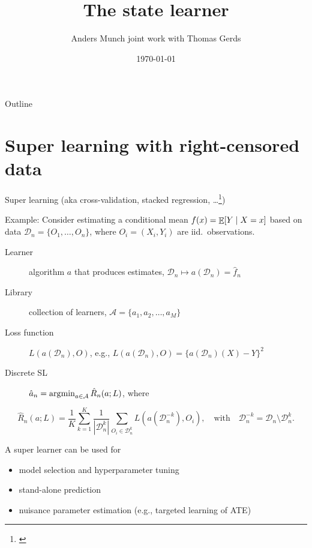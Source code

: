 \documentclass[smaller]{beamer}\usepackage{listings}
\author{Anders Munch \newline \small joint work with Thomas Gerds}
\date{\today}
\title{The state learner}
\begin{document}
\maketitle
\begin{frame}{Outline}
\tableofcontents
\end{frame}

\section{Super learning with right-censored data}
\label{sec:org2992df4}
\begin{frame}[label={sec:orgf51b327}]{Super learning \small (aka cross-validation, stacked regression, \ldots{}\footnote{\cite{stone1974cross,geisser1975predictive,wolpert1992stacked,breiman1996stacked,van2007super}})}
\small

\color{bblue}Example: \color{black} Consider estimating a conditional mean \(f(x) = {\mathop{{\mathbb{E}}}}[Y \mid X=x]\) based on data \(\mathcal{D}_n = \{O_1, \dots, O_n\}\), where \(O_i = (X_i, Y_i)\) are iid.~observations.

\vfill

\begin{description}
\item[{Learner}] algorithm \(a\) that produces estimates, \(\mathcal{D}_n \mapsto
  a(\mathcal{D}_n) = \hat f_n\)
\item[{Library}] collection of learners, \(\mathcal{A} = \{a_1, a_2, \dots, a_M \}\)
\item[{Loss function}] \(L(a(\mathcal{D}_n), O)\), e.g., \(L(a(\mathcal{D}_n), O)
  = \{a(\mathcal{D}_n)(X) - Y\}^2\) \pause
\item[{Discrete SL}] \(\hat{a}_n = \operatorname*{\arg\!\min}_{a\in\mathcal A}\hat{R}_n(a;
  L)\), where
\end{description}
\begin{equation*}
  \hat{R}_n(a; L) =
  \frac{1}{K}\sum_{k=1}^{K}
  \frac{1}{| \mathcal{D}_n^{k} |}\sum_{O_i \in \mathcal{D}_n^{k}}
  L
  {
    \left(
      a{ (\mathcal{D}_n^{-k})}
      , O_i
    \right)
  },
  \quad \text{with} \quad
  \mathcal{D}_n^{-k} = \mathcal{D}_n \setminus \mathcal{D}_n^{k}.
\end{equation*}


\vfill \pause

A super learner can be used for

\begin{itemize}
\item model selection and hyperparameter tuning
\item stand-alone prediction
\item nuisance parameter estimation (e.g., targeted learning of ATE)
\end{itemize}
\end{frame}
\end{document}
